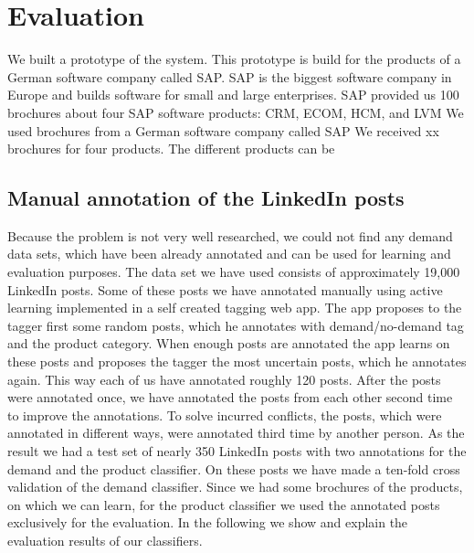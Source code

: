 
\section{Evaluation}
\label{sec:evaluation}
We built a prototype of the \nto system.
This prototype is build for the products of a German software company called SAP.
SAP is the biggest software company in Europe and builds software for small and large enterprises.
SAP provided us 100 brochures about four SAP software products: CRM, ECOM, HCM, and LVM
We used brochures from a German software company called SAP
We received xx brochures for four products.
The different products can be

\subsection{Manual annotation of the LinkedIn posts}



Because the \nto problem is not very well researched, we could not find any demand data sets, which have been already annotated and can be used for learning and evaluation purposes.
The data set we have used consists of approximately 19,000 LinkedIn posts.
Some of these posts we have annotated manually using active learning implemented in a self created tagging web app.
The app proposes to the tagger first some random posts, which he annotates with demand/no-demand tag and the product category.
When enough posts are annotated the app learns on these posts and proposes the tagger the most uncertain posts, which he annotates again.
This way each of us have annotated roughly 120 posts.
After the posts were annotated once, we have annotated the posts from each other second time to improve the annotations.
To solve incurred conflicts, the posts, which were annotated in different ways, were annotated third time by another person.
As the result we had a test set of nearly 350 LinkedIn posts with two annotations for the demand and the product classifier.
On these posts we have made a ten-fold cross validation of the demand classifier.
Since we had some brochures of the products, on which we can learn, for the product classifier we used the annotated posts exclusively for the evaluation.
In the following we show and explain the evaluation results of our classifiers.



\endinput

\begin{itemize}
	\item Introduce our data set (show numbers, show examples)
	\item How we got our training data (everything at least twice, use the demands for learning, use the products for evaluation, Active Learning approach)
	\item Reference Precision/Recall from above again, final
	\item Evaluate of the training data generation, which approach is best (random, grouping)
\end{itemize}



